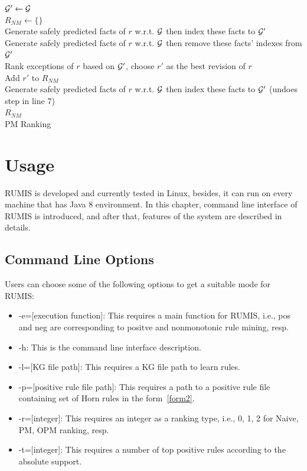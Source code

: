 \IncMargin{1.5em}
\begin{algorithm}[H]
\DontPrintSemicolon
\SetAlgoLined
{}
\BlankLine
$\mathcal{G}' \leftarrow \mathcal{G}$\\
$R_{NM} \leftarrow \{\}$\\
\BlankLine
{} {
	Generate safely predicted facts of $r$ w.r.t. $\mathcal{G}$ then index these facts to $\mathcal{G}'$\\
}
\BlankLine
{} {
	Generate safely predicted facts of $r$ w.r.t. $\mathcal{G}$ then remove these facts' indexes from $\mathcal{G}'$\\
	Rank exceptions of $r$ based on $\mathcal{G}'$, choose $r'$ as the best revision of $r$\\
	Add $r'$ to $R_{NM}$\\
	Generate safely predicted facts of $r$ w.r.t. $\mathcal{G}$ then index these facts to $\mathcal{G}'$ (undoes step in line 7)\\
}
\Return $R_{NM}$\\
\caption{PM Ranking}
\label{pm_ranking_algo}
\end{algorithm}
\DecMargin{1.5em}

\section{Usage}

RUMIS is developed and currently tested in Linux, besides, it can run on every machine that has Java 8 environment. In this chapter, command line interface of RUMIS is introduced, and after that, features of the system are described in details.

\subsection{Command Line Options}

Users can choose some of the following options to get a suitable mode for RUMIS:

\begin{itemize}
\item -e=[execution function]: This requires a main function for RUMIS, i.e., pos and neg are corresponding to positve and nonmonotonic rule mining, resp.
\item -h: This is the command line interface description.
\item -l=[KG file path]: This requires a KG file path to learn rules.
\item -p=[positive rule file path]: This requires a path to a positive rule file containing set of Horn rules in the form~\ref{form2}.
\item -r=[integer]: This requires an integer as a ranking type, i.e., 0, 1, 2 for Naive, PM, OPM ranking, resp.
\item -t=[integer]: This requires a number of top positive rules according to the absolute support.
\end{itemize}

